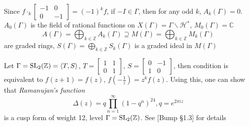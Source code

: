 \documentclass[main]{subfiles}
\begin{document}
\begin{remark}
Since $f\cdot_k\begin{bmatrix}
-1&0 \\
0&-1
\end{bmatrix}=(-1)^kf$, if $-I\in\Gamma$, then for any odd $k$, $A_k(\Gamma)=0$. $A_0(\Gamma)$ is the field of rational functions on $X(\Gamma)=\Gamma\backslash\mathcal H^*$, $M_0(\Gamma)=\mathbb C$
\[A(\Gamma)=\bigoplus_{k\in\mathbb Z}A_k(\Gamma)\supseteq M(\Gamma)=\bigoplus_{k\in\mathbb Z}M_k(\Gamma)\]
are graded rings, $S(\Gamma)=\bigoplus_{k\in\mathbb Z}S_k(\Gamma)$ is a graded ideal in $M(\Gamma)$
\end{remark}

\begin{example}
Let $\Gamma=\operatorname{SL}_2(\mathbb Z)=\langle T,S\rangle$, $T=\begin{bmatrix}
1&1\\
0&1
\end{bmatrix}$, $S=\begin{bmatrix}
0&-1\\
1&0
\end{bmatrix}$, then condition is equivalent to $f(z+1)=f(z)$, $f(-\frac{1}{z})=z^kf(z)$. Using this, one can show that \textit{Ramanujan's function}
\[\Delta(z)=q\prod_{n=1}^\infty(1-q^n)^{24},q=e^{2\pi iz}\]
is a cusp form of weight 12, level $\Gamma=\operatorname{SL}_2(\mathbb Z)$. See [Bump \S1.3] for details
\end{example}
\end{document}
